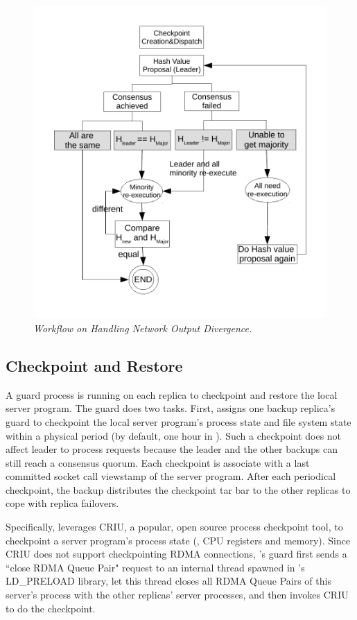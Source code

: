 
\begin{figure}[t]
\centering
\includegraphics[width=.5\textwidth]{figures/output-divergence}
\vspace{-.20in}
\caption{{\em Workflow on Handling Network Output Divergence.}} 
\label{fig:divergence}
\vspace{-.05in}
\end{figure}

\subsection{Checkpoint and Restore} \label{sec:checkpoint}


A guard process is running on each replica to checkpoint and restore the local 
server program. The guard does two tasks. First, \xxx assigns one backup 
replica's guard to checkpoint the local server program's process state and file 
system state within a physical period \tcheckpoint (by default, one hour in 
\xxx). Such a checkpoint does not affect leader to process requests because the 
leader and the other backups can still reach a consensus quorum. Each 
checkpoint is associate with a last committed socket call viewstamp of the 
server program. After each periodical checkpoint, the backup distributes the 
checkpoint tar bar to the other replicas to cope with replica failovers.

Specifically, \xxx leverages CRIU, a popular, open source process checkpoint 
tool, to checkpoint a server program's process state (\eg, CPU registers and 
memory). Since CRIU does not support checkpointing RDMA connections, \xxx's 
guard first sends a ``close RDMA Queue Pair" request to an \xxx internal thread 
spawned in \xxx's LD\_PRELOAD library, let this thread closes all RDMA Queue 
Pairs of this server's process with the other replicas' server processes, and 
then invokes CRIU to do the checkpoint.

